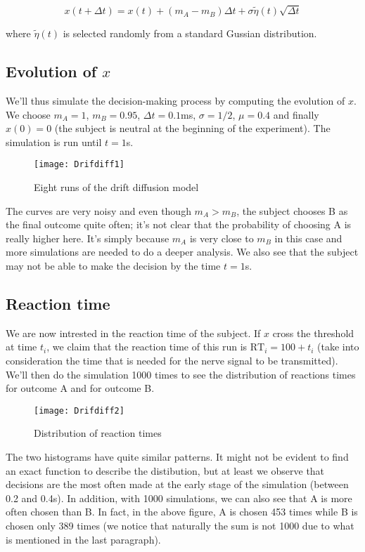 \[x(t+\Delta t) = x(t) + (m_A - m_B)\Delta t + 
  \sigma\tilde{\eta}(t)\sqrt{\Delta t}\]

\noindent
where $\tilde{\eta}(t)$ is selected randomly from a standard Gussian 
distribution.

\subsection{Evolution of $x$}

We'll thus simulate the decision-making process by computing the evolution of
$x$. We choose $m_A = 1$, $m_B = 0.95$, $\Delta t = 0.1$ms, $\sigma = 1/2$,
$\mu = 0.4$ and finally $x(0) = 0$ (the subject is neutral at the beginning of
the experiment). The simulation is run until $t = 1$s.

\vspace*{-1em}
\begin{figure}[H]
  \centering
  \texttt{[image: Drifdiff1]}
  \caption {Eight runs of the drift diffusion model}
\end{figure}

The curves are very noisy and even though $m_A > m_B$, the subject chooses B 
as the final outcome quite often; it's not clear that the probability of
choosing A is really higher here. It's simply because $m_A$ is very close to
$m_B$ in this case and more simulations are needed to do a deeper analysis.  
We also see that the subject may not be able to make the decision by the time
$t = 1$s.

\subsection{Reaction time}

We are now intrested in the reaction time of the subject. If $x$ cross the
threshold at time $t_i$, we claim that the reaction time of this run is
$\mathrm{RT}_i = 100 + t_i$ (take into consideration the time that is needed 
for the nerve signal to be transmitted). We'll then do the simulation 1000 
times to see the distribution of reactions times for outcome A and for outcome
B.

\begin{figure}[H]
  \centering
  \texttt{[image: Drifdiff2]}
  \caption {Distribution of reaction times}
\end{figure}

The two histograms have quite similar patterns. It might not be evident to 
find an exact function to describe the distibution, but at least we observe 
that decisions are the most often made at the early stage of the simulation 
(between 0.2 and 0.4s). In addition, with 1000 simulations, we can also see
that A is more often chosen than B. In fact, in the above figure, A is chosen
453 times while B is chosen only 389 times (we notice that naturally the
sum is not 1000 due to what is mentioned in the last paragraph).

